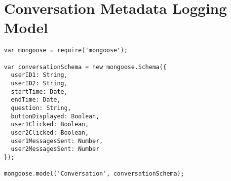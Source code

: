 \section{Conversation Metadata Logging Model}

\begin{lstlisting}
var mongoose = require('mongoose');

var conversationSchema = new mongoose.Schema({
  userID1: String,
  userID2: String,
  startTime: Date,
  endTime: Date,
  question: String,
  buttonDisplayed: Boolean,
  user1Clicked: Boolean,
  user2Clicked: Boolean,
  user1MessagesSent: Number,
  user2MessagesSent: Number
});

mongoose.model('Conversation', conversationSchema);
\end{lstlisting}
